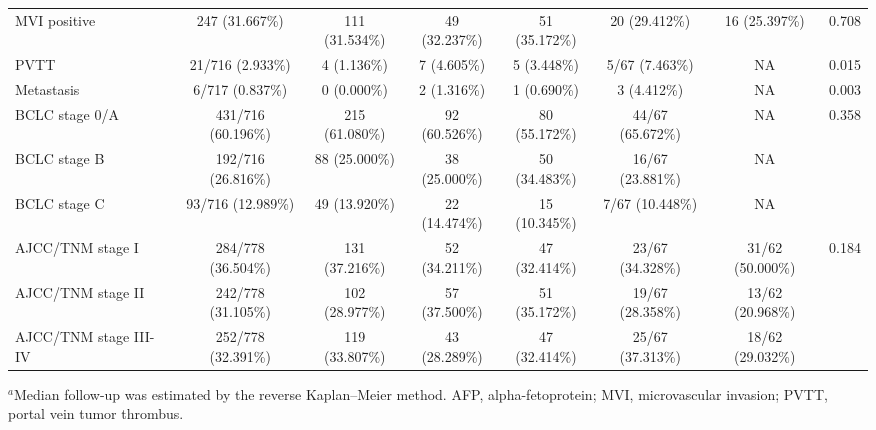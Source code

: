 \begin{table}[htbp]
{\begin{tabular}{lccccccc}
MVI positive & 247 (31.667\%) & 111 (31.534\%) & 49 (32.237\%) & 51 (35.172\%) & 20 (29.412\%) & 16 (25.397\%) & 0.708 \\
PVTT & 21/716 (2.933\%) & 4 (1.136\%) & 7 (4.605\%) & 5 (3.448\%) & 5/67 (7.463\%) & NA & 0.015 \\
Metastasis & 6/717 (0.837\%) & 0 (0.000\%) & 2 (1.316\%) & 1 (0.690\%) & 3 (4.412\%) & NA & 0.003 \\
BCLC stage 0/A & 431/716 (60.196\%) & 215 (61.080\%) & 92 (60.526\%) & 80 (55.172\%) & 44/67 (65.672\%) & NA & 0.358 \\
BCLC stage B & 192/716 (26.816\%) & 88 (25.000\%) & 38 (25.000\%) & 50 (34.483\%) & 16/67 (23.881\%) & NA &  \\
BCLC stage C & 93/716 (12.989\%) & 49 (13.920\%) & 22 (14.474\%) & 15 (10.345\%) & 7/67 (10.448\%) & NA &  \\
AJCC/TNM stage I & 284/778 (36.504\%) & 131 (37.216\%) & 52 (34.211\%) & 47 (32.414\%) & 23/67 (34.328\%) & 31/62 (50.000\%) & 0.184 \\
AJCC/TNM stage II & 242/778 (31.105\%) & 102 (28.977\%) & 57 (37.500\%) & 51 (35.172\%) & 19/67 (28.358\%) & 13/62 (20.968\%) &  \\
AJCC/TNM stage III-IV & 252/778 (32.391\%) & 119 (33.807\%) & 43 (28.289\%) & 47 (32.414\%) & 25/67 (37.313\%) & 18/62 (29.032\%) &  \\
\bottomrule
\end{tabular}%
}
\vspace{0.4em}
\parbox{\textwidth}{\footnotesize $^{a}$Median follow-up was estimated by the reverse Kaplan--Meier method. AFP, alpha-fetoprotein; MVI, microvascular invasion; PVTT, portal vein tumor thrombus.}
\end{table}
